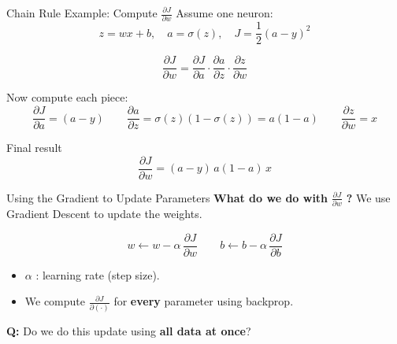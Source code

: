 \begin{frame}{Chain Rule Example: Compute $\frac{\partial J}{\partial w}$}
Assume one neuron:
\[
z=wx+b,\quad a=\sigma(z),\quad J=\frac{1}{2}(a-y)^2
\]

\begin{tcolorbox}[colback=yellow!8, colframe=orange!70, title=\textbf{Chain Rule (backprop)}]
\[
\frac{\partial J}{\partial w}
=
\frac{\partial J}{\partial a}
\cdot
\frac{\partial a}{\partial z}
\cdot
\frac{\partial z}{\partial w}
\]
\end{tcolorbox}

\vspace{0.1em}
Now compute each piece:
\[
\frac{\partial J}{\partial a} = (a-y)
\qquad
\frac{\partial a}{\partial z} = \sigma(z)(1-\sigma(z)) = a(1-a)
\qquad
\frac{\partial z}{\partial w} = x
\]

\begin{block}{Final result}
\[
\boxed{
\frac{\partial J}{\partial w} = (a-y)\,a(1-a)\,x
}
\]
\end{block}
\end{frame}

\begin{frame}{Using the Gradient to Update Parameters}
\textbf{What do we do with } $\frac{\partial J}{\partial w}$ \textbf{?}  
We use Gradient Descent to update the weights.

\vspace{0.8em}
\begin{tcolorbox}[colback=green!6, colframe=green!50!black, title=\textbf{Parameter Update Rule (via Gradient Descent)}]
\[
w \leftarrow w - \alpha \,\frac{\partial J}{\partial w}
\qquad
b \leftarrow b - \alpha \,\frac{\partial J}{\partial b}
\]
\end{tcolorbox}

\vspace{0.6em}
\small
\begin{itemize}
    \item $\alpha$ : learning rate (step size).
    \item We compute $\frac{\partial J}{\partial(\cdot)}$ for \textbf{every} parameter using backprop.
\end{itemize}

\pause
\begin{tcolorbox}[colback=yellow!8, colframe=orange!70, arc=8pt]
\centering
\textbf{Q:}
Do we do this update using \textbf{all data at once}?
\end{tcolorbox}
\end{frame}





